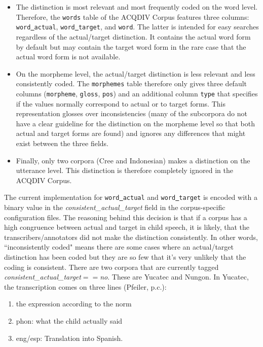 \documentclass[a4paper, 11pt]{book}
\newcommand{\und}{\underline{{ }}\hspace{0.2mm}}	%
\begin{document}
\begin{itemize}
	\item The distinction is most relevant and most frequently coded on the word level. Therefore, the \texttt{words} table of the ACQDIV Corpus
		features three columns: \texttt{word\und actual}, \texttt{word\und target}, and \texttt{word}. The latter is intended for easy searches
		regardless of the actual/target distinction. It contains the actual word form by default but may contain the target word form in the rare
		case that the actual word form is not available.
	\item On the morpheme level, the actual/target distinction is less relevant and less consistently coded. The \texttt{morphemes} table
		therefore only gives three default columns (\texttt{morpheme}, \texttt{gloss}, \texttt{pos}) and an additional column \texttt{type}
		that specifies if the values normally correspond to actual or to target forms. This representation glosses over inconsistencies (many of the subcorpora 
		do not have a clear guideline for the distinction on the morpheme level so that both actual and target forms are found) and ignores any 
		differences that might exist between the three fields. 
	\item Finally, only two corpora (Cree and Indonesian) makes a distinction on the utterance level. This distinction is therefore completely ignored in the ACQDIV Corpus. 
\end{itemize}

The current implementation for \texttt{word\und actual} and \texttt{word\und target} is encoded with a binary value in the \textit{consistent\_actual\_target} field in the corpus-specific configuration files. The reasoning behind this decision is that if a corpus has a high congruence between actual and target in child speech, it is likely, that the transcribers/annotators did not make the distinction consistently. In other words, ``inconsistently coded" means there are some cases where an actual/target distinction has been coded but they are so few that it's very unlikely that the coding is consistent. There are two corpora that are currently tagged \textit{consistent\_actual\_target$==$no}. These are Yucatec and Nungon. In Yucatec, the transcription comes on three lines (Pfeiler, p.c.):

\begin{enumerate}
\item the expression according to the norm
\item phon: what the child actually said
\item eng/esp: Translation into Spanish.
\end{enumerate}
\end{document}
